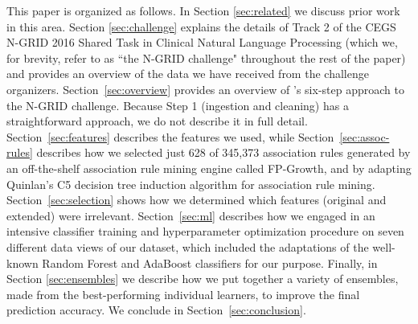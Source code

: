 

This paper is organized as follows. In Section \ref{sec:related} we discuss prior work in this area.  Section
\ref{sec:challenge} explains the details of Track 2 of the CEGS N-GRID 2016 Shared Task in Clinical Natural Language Processing (which we, for brevity, refer to as ``the N-GRID challenge"
throughout the rest of the paper) and provides an
overview of the data we have received from the challenge organizers.  
Section~\ref{sec:overview} provides an overview of \CREATE's six-step
approach to the N-GRID challenge.  Because Step 1 (ingestion and cleaning) has a straightforward approach, we do not describe it in full detail.
Section~\ref{sec:features} describes the features we used, while
Section~\ref{sec:assoc-rules} describes how we selected just 628 of 345,373 association rules  generated by an off-the-shelf association rule mining engine
called FP-Growth\cite{fpgrowth}, and by adapting Quinlan's C5 decision tree
induction algorithm \cite{c45,c5} for association rule mining. 
Section~\ref{sec:selection} shows how we determined 
which features (original and extended) were irrelevant.
Section~\ref{sec:ml} describes how  we engaged in an intensive classifier training and
hyperparameter optimization procedure on seven different data views of our dataset, 
which included the  adaptations of the well-known Random Forest and AdaBoost classifiers
for our purpose.  Finally, in Section \ref{sec:ensembles} we describe how we put together 
a variety of ensembles, made from the best-performing individual learners, to 
improve the final prediction accuracy.
We conclude in Section~\ref{sec:conclusion}.
